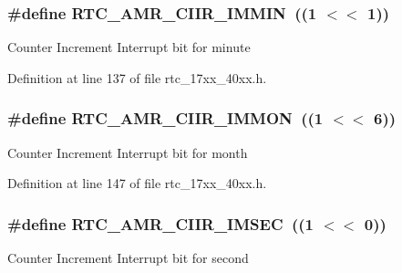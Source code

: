 \subsubsection[{\texorpdfstring{R\+T\+C\+\_\+\+A\+M\+R\+\_\+\+C\+I\+I\+R\+\_\+\+I\+M\+M\+IN}{RTC_AMR_CIIR_IMMIN}}]{\setlength{\rightskip}{0pt plus 5cm}\#define R\+T\+C\+\_\+\+A\+M\+R\+\_\+\+C\+I\+I\+R\+\_\+\+I\+M\+M\+IN~((1 $<$$<$ 1))}\hypertarget{group__RTC__17XX__40XX_ga3d67e7c72ec7bcd0831628841496cbc6}{}\label{group__RTC__17XX__40XX_ga3d67e7c72ec7bcd0831628841496cbc6}
Counter Increment Interrupt bit for minute 

Definition at line 137 of file rtc\+\_\+17xx\+\_\+40xx.\+h.

\subsubsection[{\texorpdfstring{R\+T\+C\+\_\+\+A\+M\+R\+\_\+\+C\+I\+I\+R\+\_\+\+I\+M\+M\+ON}{RTC_AMR_CIIR_IMMON}}]{\setlength{\rightskip}{0pt plus 5cm}\#define R\+T\+C\+\_\+\+A\+M\+R\+\_\+\+C\+I\+I\+R\+\_\+\+I\+M\+M\+ON~((1 $<$$<$ 6))}\hypertarget{group__RTC__17XX__40XX_ga841dfecc952d8b6d275e799cb9e89c02}{}\label{group__RTC__17XX__40XX_ga841dfecc952d8b6d275e799cb9e89c02}
Counter Increment Interrupt bit for month 

Definition at line 147 of file rtc\+\_\+17xx\+\_\+40xx.\+h.

\subsubsection[{\texorpdfstring{R\+T\+C\+\_\+\+A\+M\+R\+\_\+\+C\+I\+I\+R\+\_\+\+I\+M\+S\+EC}{RTC_AMR_CIIR_IMSEC}}]{\setlength{\rightskip}{0pt plus 5cm}\#define R\+T\+C\+\_\+\+A\+M\+R\+\_\+\+C\+I\+I\+R\+\_\+\+I\+M\+S\+EC~((1 $<$$<$ 0))}\hypertarget{group__RTC__17XX__40XX_ga30c785b6017020d4c0b61b22aff30aac}{}\label{group__RTC__17XX__40XX_ga30c785b6017020d4c0b61b22aff30aac}
Counter Increment Interrupt bit for second 

